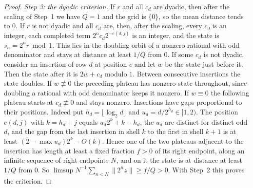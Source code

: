 \documentclass[11pt]{article}
\begin{document}
\begin{proof}
\emph{Step 3: the dyadic criterion.} If $r$ and all $c_d$ are dyadic, then after the scaling of Step~1 we have $Q=1$ and the grid is $\{0\}$, so the mean distance tends to $0$. If $r$ is not dyadic and all $c_d$ are, then, after the scaling, every $c_d$ is an integer, each completed term $2^nc_d2^{-e(d,j)}$ is an integer, and the state is $s_n=2^nr\bmod1$. This lies in the doubling orbit of a nonzero rational with odd denominator and stays at distance at least $1/Q$ from $0$. If some $c_d$ is not dyadic, consider an insertion of row $d$ at position $e$ and let $w$ be the state just before it. Then the state after it is $2w+c_d$ modulo $1$. Between consecutive insertions the state doubles. If $w\not\equiv0$ the preceding plateau has nonzero state throughout, since doubling a rational with odd denominator keeps it nonzero. If $w\equiv0$ the following plateau starts at $c_d\not\equiv0$ and stays nonzero. Insertions have gaps proportional to their positions. Indeed put $h_d=\lfloor\log_2d\rfloor$ and $u_d=d/2^{h_d}\in[1,2)$. The position $e(d,j)$ with $k=h_d+j$ equals $u_d2^k+k-h_d$, the $u_d$ are distinct for distinct odd $d$, and the gap from the last insertion in shell $k$ to the first in shell $k+1$ is at least $(2-\max u_d)2^k-O(k)$. Hence one of the two plateaus adjacent to the insertion has length at least a fixed fraction $f>0$ of its right endpoint, along an infinite sequence of right endpoints $N$, and on it the state is at distance at least $1/Q$ from $0$. So $\limsup N^{-1}\sum_{n<N}\|2^nz\|\ge f/Q>0$. With Step~2 this proves the criterion.


\end{proof}
\end{document}
